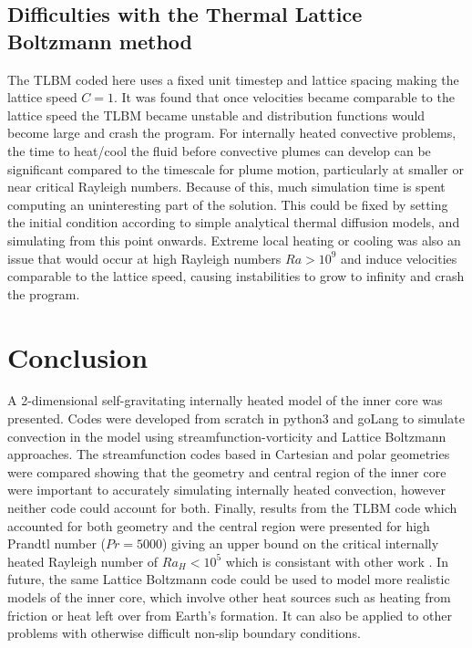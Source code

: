\documentclass{article}
\begin{document}
\subsection*{Difficulties with the Thermal Lattice Boltzmann method}
The TLBM coded here uses a fixed unit timestep and lattice spacing making the lattice speed $C=1$. It was found that once velocities became comparable to the lattice speed the TLBM became unstable and distribution functions would become large and crash the program. For internally heated convective problems, the time to heat/cool the fluid before convective plumes can develop can be significant compared to the timescale for plume motion, particularly at smaller or near critical Rayleigh numbers. Because of this, much simulation time is spent computing an uninteresting part of the solution. This could be fixed by setting the initial condition according to simple analytical thermal diffusion models, and simulating from this point onwards. Extreme local heating or cooling was also an issue that would occur at high Rayleigh numbers $Ra>10^9$ and induce velocities comparable to the lattice speed, causing instabilities to grow to infinity and crash the program.
\newline



\section*{Conclusion}

A 2-dimensional self-gravitating internally heated model of the inner core was presented. Codes 
were developed from scratch in python3 and goLang to simulate convection in the model using 
streamfunction-vorticity and Lattice Boltzmann approaches. The streamfunction codes based in 
Cartesian and polar geometries were compared showing that the geometry and central region of the 
inner core were important to accurately simulating internally heated convection, however neither 
code could account for both. Finally, results from the TLBM code which accounted for both geometry 
and the central region were presented for high Prandtl number ($Pr=5000$) giving an upper bound on 
the critical internally heated Rayleigh number of $Ra_H < 10^5$ which is consistant with other work \cite{babskii1971convection}. In future, the same Lattice Boltzmann
code could be used to model more realistic models of the inner core, which involve other heat sources such as heating from friction or heat left over from Earth's formation. It can also be applied to other problems with 
otherwise difficult non-slip boundary conditions.
\end{document}
